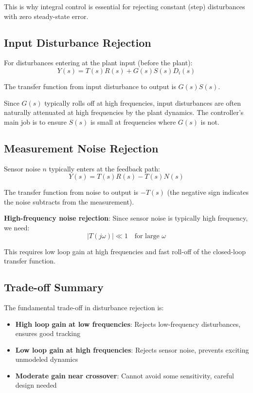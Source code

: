 This is why integral control is essential for rejecting constant (step) disturbances with zero steady-state error.

\subsection{Input Disturbance Rejection}

For disturbances entering at the plant input (before the plant):
\begin{equation}
    Y(s) = T(s) R(s) + G(s) S(s) D_i(s)
\end{equation}

The transfer function from input disturbance to output is $G(s) S(s)$.

Since $G(s)$ typically rolls off at high frequencies, input disturbances are often naturally attenuated at high frequencies by the plant dynamics. The controller's main job is to ensure $S(s)$ is small at frequencies where $G(s)$ is not.

\subsection{Measurement Noise Rejection}

Sensor noise $n$ typically enters at the feedback path:
\begin{equation}
    Y(s) = T(s) R(s) - T(s) N(s)
\end{equation}

The transfer function from noise to output is $-T(s)$ (the negative sign indicates the noise subtracts from the measurement).

\textbf{High-frequency noise rejection}: Since sensor noise is typically high frequency, we need:
\begin{equation}
    |T(j\omega)| \ll 1 \quad \text{for large } \omega
\end{equation}

This requires low loop gain at high frequencies and fast roll-off of the closed-loop transfer function.

\subsection{Trade-off Summary}

The fundamental trade-off in disturbance rejection is:
\begin{itemize}
    \item \textbf{High loop gain at low frequencies}: Rejects low-frequency disturbances, ensures good tracking
    \item \textbf{Low loop gain at high frequencies}: Rejects sensor noise, prevents exciting unmodeled dynamics
    \item \textbf{Moderate gain near crossover}: Cannot avoid some sensitivity, careful design needed
\end{itemize}

